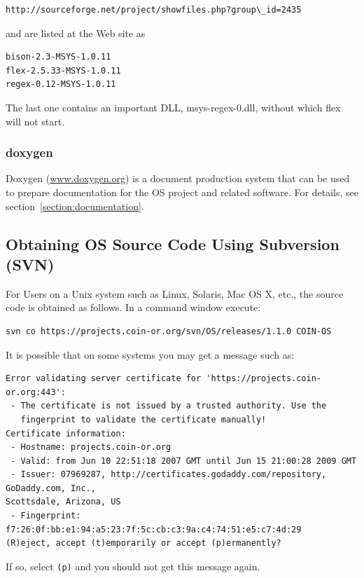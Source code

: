 \documentclass[11pt]{article}
\renewcommand{\_}{{\char"5F}}
\renewcommand{\{}{{\char"7B}}
\renewcommand{\}}{{\char"7D}}
\renewcommand{\^}{{\char"0D}}
\renewcommand{\'}{{\char"0D}}
\begin{document}
\begin{verbatim}
http://sourceforge.net/project/showfiles.php?group\_id=2435
\end{verbatim}
and are listed at the Web site as

\begin{verbatim}
bison-2.3-MSYS-1.0.11
flex-2.5.33-MSYS-1.0.11
regex-0.12-MSYS-1.0.11
\end{verbatim}
The last one contains an important DLL, msys-regex-0.dll, without which flex
will not start.

\subsubsection{doxygen }\label{section:doxygen}
Doxygen  (\url{www.doxygen.org}) is a document production system that can be used to prepare documentation 
for the OS project and related software. For details, see section~\ref{section:documentation}.


\subsection{Obtaining OS Source Code Using Subversion (SVN)}\label{section:downloadwithsvn}

For Users on a Unix system such as Linux, Solaris, Mac OS X, etc., the source code is obtained as follows. In a command window execute:

\begin{verbatim}
svn co https://projects.coin-or.org/svn/OS/releases/1.1.0 COIN-OS
\end{verbatim}


It is possible that on some systems you may get a message such as:
\begin{verbatim}
Error validating server certificate for 'https://projects.coin-or.org:443':
 - The certificate is not issued by a trusted authority. Use the
   fingerprint to validate the certificate manually!
Certificate information:
 - Hostname: projects.coin-or.org
 - Valid: from Jun 10 22:51:18 2007 GMT until Jun 15 21:00:28 2009 GMT
 - Issuer: 07969287, http://certificates.godaddy.com/repository, GoDaddy.com, Inc., 
Scottsdale, Arizona, US
 - Fingerprint: f7:26:0f:bb:e1:94:a5:23:7f:5c:cb:c3:9a:c4:74:51:e5:c7:4d:29
(R)eject, accept (t)emporarily or accept (p)ermanently?
\end{verbatim}

If so, select {\tt (p)} and you should not get this message again.
\end{document}
